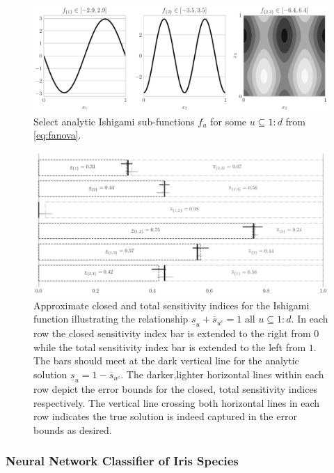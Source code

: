 \documentclass[graybox]{svmult}
\begin{document}
\begin{figure}[t]
    \centering
    \includegraphics[width=.8\textwidth]{figs/ishigami_fu.pdf}
    \caption{Select analytic Ishigami sub-functions $f_u$ for some $u \subseteq 1:d$ from \eqref{eq:fanova}.}
    \label{fig:ishigami_fu}
\end{figure}

\begin{figure}[t]
    \centering
    \includegraphics[width=.8\textwidth]{figs/ishigami.pdf}
    \caption{Approximate closed and total sensitivity indices for the Ishigami function illustrating the relationship $\underline{s}_u + \overline{s}_{u^c} = 1$ all $u \subseteq 1:d$. In each row the closed sensitivity index bar is  extended to the right from $0$ while the total sensitivity index bar is extended to the left from $1$. The bars should meet at the dark vertical line for the  analytic solution $\underline{s}_u=1-\overline{s}_{u^c}$. The darker,lighter horizontal lines within each row depict the error bounds for the closed, total sensitivity indices respectively. The vertical line crossing both horizontal lines in each row indicates the true solution is indeed captured in the error bounds as desired.}
    \label{fig:ishigami}
\end{figure}

\subsubsection{Neural Network Classifier of Iris Species}
\end{document}
